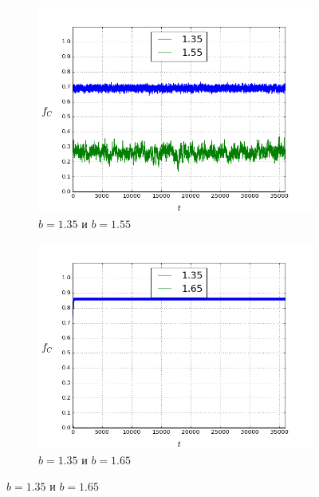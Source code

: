 \documentclass[a4paper]{article}
\begin{document}
\begin{figure}[H]
	\begin{subfigure}{.5\textwidth}
		\includegraphics[width=.8\linewidth]{135-155.png}
		\caption{$b=1.35$ и $b=1.55$}
	\end{subfigure}
	\begin{subfigure}{.5\textwidth}
		\includegraphics[width=.8\linewidth]{135-165.png}
		\caption{$b=1.35$ и $b=1.65$}
	\end{subfigure}%
	

\end{figure}
\end{document}
